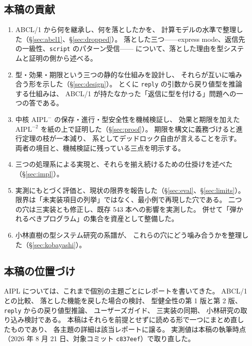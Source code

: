 \documentclass[11pt,a4paper]{ltjsarticle}
\theoremstyle{definition}
\theoremstyle{remark}
\begin{document}
\subsection*{本稿の貢献}

\begin{enumerate}
\item ABCL/1 から何を継承し、何を落としたかを、
      計算モデルの水準で整理した（\S\ref{sec:abcl1}、\S\ref{sec:dropped}）。
      落とした三つ——express mode、返信先の一級性、\texttt{script} のパターン受信——
      について、落とした理由を型システムと証明の側から述べる。
\item 型・効果・期限という三つの静的な仕組みを設計し、
      それらが互いに噛み合う形を示した（\S\ref{sec:design}）。
      とくに \texttt{reply} の引数から戻り値型を推論する仕組みは、
      ABCL/1 が持たなかった「返信に型を付ける」問題への一つの答である。
\item 中核 $\mathrm{AIPL}^{-}$ の保存・進行・型安全性を機械検証し、
      効果と期限を加えた $\mathrm{AIPL}^{-2}$ を紙の上で証明した（\S\ref{sec:proof}）。
      期限を構文に義務づけると進行定理の枝が一本減り、
      系としてデッドロック自由が言えることを示す。
      両者の境目と、機械検証に残っている三点を明示する。
\item 三つの処理系による実現と、それらを揃え続けるための仕掛けを述べた
      （\S\ref{sec:impl}）。
\item 実測にもとづく評価と、現状の限界を報告した（\S\ref{sec:eval}、\S\ref{sec:limits}）。
      限界は「未実装項目の列挙」ではなく、最小例で再現した穴である。
      二つの穴は三実装とも修正し、既存 543 本への影響を実測した。
      併せて「弾かれるべきプログラム」の集合を資産として整備した。
\item 小林直樹の型システム研究の系譜が、
      これらの穴にどう噛み合うかを整理した（\S\ref{sec:kobayashi}）。
\end{enumerate}

\subsection*{本稿の位置づけ}

AIPL については、これまで個別の主題ごとにレポートを書いてきた。
ABCL/1 との比較\cite{selfvsabcl1}、
落とした機能を戻した場合の検討\cite{selffeatures}、
型健全性の第 1 版\cite{selfsound1}と第 2 版\cite{selfsound2}、
\texttt{reply} からの戻り値型推論\cite{selfreply}、
ユーザーズガイド\cite{selfguide}、
三実装の同期\cite{selfparity}、
小林研究の取り込み検討\cite{selfkoba}である。
本稿はそれらを前提とせずに読める形で一つにまとめ直したものであり、
各主題の詳細は該当レポートに譲る。
実測値は本稿の執筆時点（2026 年 8 月 21 日、対象コミット \texttt{c837eef}）で取り直した。
\end{document}
